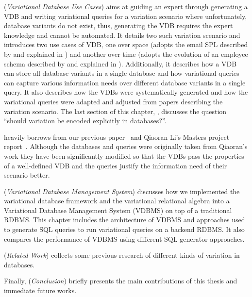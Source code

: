  (\emph{Variational Database Use Cases}) 
aims at guiding an expert through generating a VDB and writing
variational queries for a variation scenario where unfortunately,  database variants
do not exist, thus, generating the VDB requires the expert knowledge and cannot
be automated. 
%
It details two such variation scenario and introduces two use cases of VDB, one over space
(adopts the email SPL described by \citet{Hall05} and explained in )
 and another over time (adopts the evolution 
of an employee schema described by \citet{prima08Moon} and explained in ).
Additionally, it describes how a VDB can store all database variants in a single database and
 how variational queries can capture various information needs over different database variants
in a single query. It also describes how  the VDBs were systematically 
generated and how the variational queries
were adapted and adjusted from papers describing the variation scenario. 
%
The last section of this chapter, , discusses the question 
``should variation be encoded explicitly in databases?''.

 heavily borrows from our previous paper~\cite{ALW21vamos} and Qiaoran Li's Masters project report~\cite{Li19}. 
Although the databases and queries were originally taken from Qiaoran's work they 
have been significantly modified  so that the VDBs pass the properties of a well-defined VDB and 
the queries justify the information need of their scenario better. 


 (\emph{Variational Database Management System}) discusses how we implemented 
the variational database framework and the variational relational
algebra into a Variational Database Management System (VDBMS) on top of
a traditional RDBMS. This chapter 
includes the architecture of VDBMS and approaches used to generate SQL
queries to run variational queries on a backend RDBMS. It also compares the
performance of VDBMS using different SQL generator approaches. 



 (\emph{Related Work}) collects some previous research of different kinds of variation 
in databases.

Finally,  (\emph{Conclusion}) briefly presents the main contributions 
of this thesis and immediate future works. 

